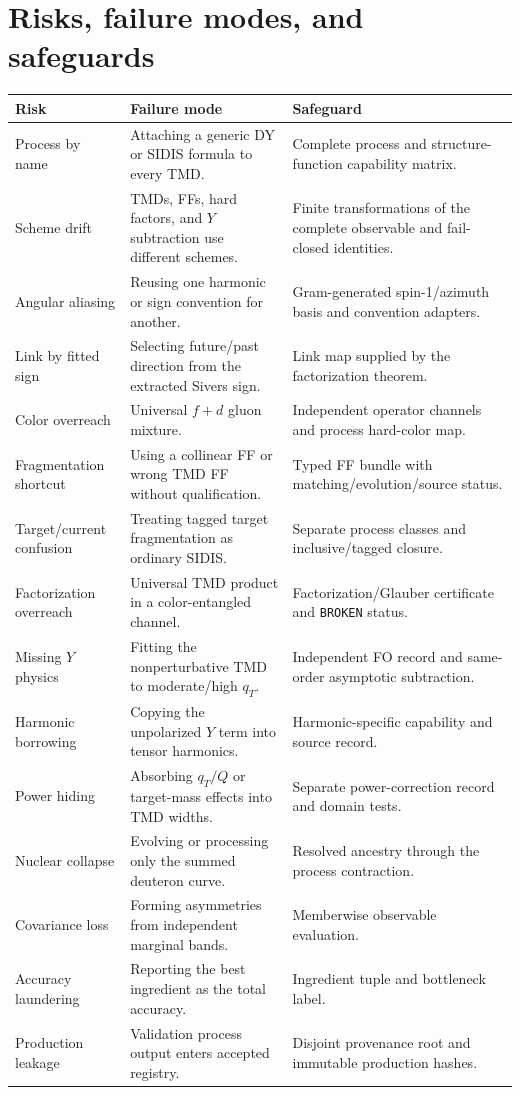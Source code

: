 \documentclass[11pt]{article}
\begin{document}
\section{Risks, failure modes, and safeguards}
\label{sec:risks}

\begin{longtable}{L{0.22\textwidth}L{0.34\textwidth}L{0.36\textwidth}}
\toprule
Risk & Failure mode & Safeguard\\
\midrule
\endhead
Process by name & Attaching a generic DY or SIDIS formula to every TMD. & Complete process and structure-function capability matrix.\\
Scheme drift & TMDs, FFs, hard factors, and \(Y\) subtraction use different schemes. & Finite transformations of the complete observable and fail-closed identities.\\
Angular aliasing & Reusing one harmonic or sign convention for another. & Gram-generated spin-1/azimuth basis and convention adapters.\\
Link by fitted sign & Selecting future/past direction from the extracted Sivers sign. & Link map supplied by the factorization theorem.\\
Color overreach & Universal \(f+d\) gluon mixture. & Independent operator channels and process hard-color map.\\
Fragmentation shortcut & Using a collinear FF or wrong TMD FF without qualification. & Typed FF bundle with matching/evolution/source status.\\
Target/current confusion & Treating tagged target fragmentation as ordinary SIDIS. & Separate process classes and inclusive/tagged closure.\\
Factorization overreach & Universal TMD product in a color-entangled channel. & Factorization/Glauber certificate and \texttt{BROKEN} status.\\
Missing \(Y\) physics & Fitting the nonperturbative TMD to moderate/high \(q_T\). & Independent FO record and same-order asymptotic subtraction.\\
Harmonic borrowing & Copying the unpolarized \(Y\) term into tensor harmonics. & Harmonic-specific capability and source record.\\
Power hiding & Absorbing \(q_T/Q\) or target-mass effects into TMD widths. & Separate power-correction record and domain tests.\\
Nuclear collapse & Evolving or processing only the summed deuteron curve. & Resolved ancestry through the process contraction.\\
Covariance loss & Forming asymmetries from independent marginal bands. & Memberwise observable evaluation.\\
Accuracy laundering & Reporting the best ingredient as the total accuracy. & Ingredient tuple and bottleneck label.\\
Production leakage & Validation process output enters accepted registry. & Disjoint provenance root and immutable production hashes.\\
\bottomrule
\end{longtable}
\end{document}
